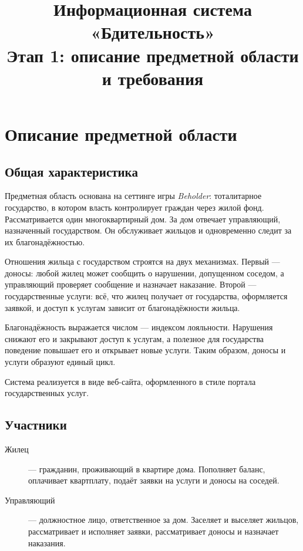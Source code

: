 \documentclass[12pt,a4paper]{article}
\title{Информационная система «Бдительность»\\[4pt]
\large Этап 1: описание предметной области и требования}
\author{}
\date{}
\begin{document}
\maketitle
\tableofcontents
\newpage

\section{Описание предметной области}

\subsection{Общая характеристика}

Предметная область основана на сеттинге игры \emph{Beholder}: тоталитарное
государство, в котором власть контролирует граждан через жилой фонд.
Рассматривается один многоквартирный дом. За дом отвечает управляющий,
назначенный государством. Он обслуживает жильцов и одновременно следит за
их благонадёжностью.

Отношения жильца с государством строятся на двух механизмах. Первый ---
доносы: любой жилец может сообщить о нарушении, допущенном соседом, а
управляющий проверяет сообщение и назначает наказание. Второй ---
государственные услуги: всё, что жилец получает от государства, оформляется
заявкой, и доступ к услугам зависит от благонадёжности жильца.

Благонадёжность выражается числом --- индексом лояльности. Нарушения
снижают его и закрывают доступ к услугам, а полезное для государства
поведение повышает его и открывает новые услуги. Таким образом, доносы и
услуги образуют единый цикл.

Система реализуется в виде веб-сайта, оформленного в стиле портала
государственных услуг.

\subsection{Участники}

\begin{description}
  \item[Жилец] --- гражданин, проживающий в квартире дома. Пополняет
    баланс, оплачивает квартплату, подаёт заявки на услуги и доносы на
    соседей.
  \item[Управляющий] --- должностное лицо, ответственное за дом. Заселяет
    и выселяет жильцов, рассматривает и исполняет заявки, рассматривает
    доносы и назначает наказания.
\end{description}
\end{document}
